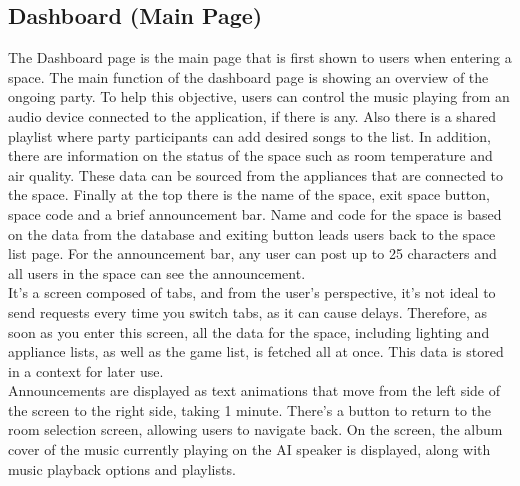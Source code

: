 \documentclass[conference]{IEEEtran}
\begin{document}
    \subsection{Dashboard (Main Page)}
        The Dashboard page is the main page that is first shown to users when entering a space. The main function of the dashboard page is showing an overview of the ongoing party. To help this objective, users can control the music playing from an audio device connected to the application, if there is any. Also there is a shared playlist where party participants can add desired songs to the list. In addition, there are information on the status of the space such as room temperature and air quality. These data can be sourced from the appliances that are connected to the space. Finally at the top there is the name of the space, exit space button, space code and a brief announcement bar. Name and code for the space is based on the data from the database and exiting button leads users back to the space list page. For the announcement bar, any user can post up to 25 characters and all users in the space can see the announcement.\\
        It's a screen composed of tabs, and from the user's perspective, it's not ideal to send requests every time you switch tabs, as it can cause delays. Therefore, as soon as you enter this screen, all the data for the space, including lighting and appliance lists, as well as the game list, is fetched all at once. This data is stored in a context for later use.\\        
        Announcements are displayed as text animations that move from the left side of the screen to the right side, taking 1 minute. There's a button to return to the room selection screen, allowing users to navigate back. On the screen, the album cover of the music currently playing on the AI speaker is displayed, along with music playback options and playlists.
\end{document}
